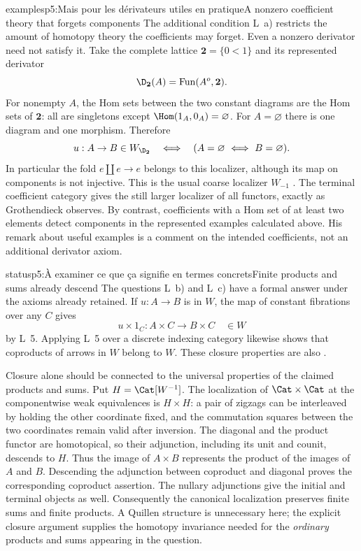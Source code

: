 \begin{dcomment}{examples}{p5:Mais pour les dérivateurs utiles en pratique}{A nonzero coefficient theory that forgets components}
The additional condition L~a) restricts the amount of homotopy theory the coefficients may forget. Even a nonzero derivator need not satisfy it. Take the complete lattice $\mathbf 2=\{0<1\}$ and its represented derivator
\[
 \D_{\mathbf 2}(A)=\operatorname{Fun}(A^o,\mathbf 2).
\]
For nonempty $A$, the Hom sets between the two constant diagrams are the Hom sets of $\mathbf 2$: all are singletons except $\Hom(1_A,0_A)=\varnothing$. For $A=\varnothing$ there is one diagram and one morphism. Therefore
\[
 u:A\to B\in W_{\D_{\mathbf 2}}
 \quad\Longleftrightarrow\quad
 (A=\varnothing\ \Longleftrightarrow\ B=\varnothing).
\]
In particular the fold $e\amalg e\to e$ belongs to this localizer, although its map on components is not injective. This is the usual coarse localizer $W_{-1}$ \citep[Examples~3.3.5--3.3.6]{Cisinski2006}. The terminal coefficient category gives the still larger localizer of all functors, exactly as Grothendieck observes. By contrast, coefficients with a Hom set of at least two elements detect components in the represented examples calculated above. His remark about useful examples is a comment on the intended coefficients, not an additional derivator axiom.
\end{dcomment}

\begin{dcomment}{status}{p5:À examiner ce que ça signifie en termes concrets}{Finite products and sums already descend}
The questions L~b) and L~c) have a formal answer under the axioms already retained. If $u:A\to B$ is in $W$, the map of constant fibrations over any $C$ gives
\[
 u\times1_C:A\times C\longrightarrow B\times C\quad\in W
\]
by L~5. Applying L~5 over a discrete indexing category likewise shows that coproducts of arrows in $W$ belong to $W$. These closure properties are also \citet[Propositions~1.1.5 and 1.1.7]{Cisinski2004Minimal}.

Closure alone should be connected to the universal properties of the claimed products and sums. Put $H=\Cat[W^{-1}]$. The localization of $\Cat\times\Cat$ at the componentwise weak equivalences is $H\times H$: a pair of zigzags can be interleaved by holding the other coordinate fixed, and the commutation squares between the two coordinates remain valid after inversion. The diagonal and the product functor are homotopical, so their adjunction, including its unit and counit, descends to $H$. Thus the image of $A\times B$ represents the product of the images of $A$ and $B$. Descending the adjunction between coproduct and diagonal proves the corresponding coproduct assertion. The nullary adjunctions give the initial and terminal objects as well. Consequently the canonical localization preserves finite sums and finite products. A Quillen structure is unnecessary here; the explicit closure argument supplies the homotopy invariance needed for the \emph{ordinary} products and sums appearing in the question.
\end{dcomment}
